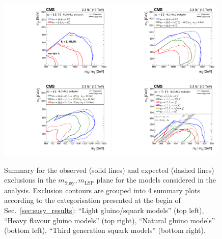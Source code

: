 \begin{figure}[thp!]
  \begin{center}
    \includegraphics[width=0.49\textwidth]{figures/susyResults/mixSUMMARY.pdf}
    \includegraphics[width=0.49\textwidth]{figures/susyResults/gluinoSUMMARY.pdf} \\
    \includegraphics[width=0.49\textwidth]{figures/susyResults/naturalSUMMARY.pdf}
    \includegraphics[width=0.49\textwidth]{figures/susyResults/allThirdGenSUMMARY.pdf} \\
    \caption{Summary for the observed (solid lines) and expected (dashed lines) exclusions in the $m_{\mathrm{Susy}},m_{\mathrm{LSP}}$ plane for the models considered in the analysis. 
       Exclusion contours are grouped into 4 summary plots according to the categorisation presented at the begin of Sec.~\ref{sec:susy_results}: 
       ``Light gluino/squark models'' (top left), ``Heavy flavour gluino models'' (top right), ``Natural gluino models'' (bottom left), ``Third generation squark models'' (bottom right). 
      \label{fig:summary-excl-plots} }
  \end{center}
\end{figure}


